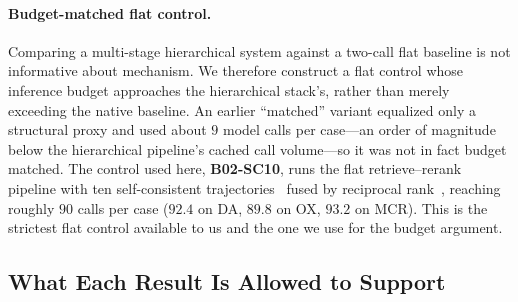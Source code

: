 \paragraph{Budget-matched flat control.}
Comparing a multi-stage hierarchical system against a two-call flat baseline is not informative about mechanism.
We therefore construct a flat control whose inference budget approaches the hierarchical stack's, rather than merely exceeding the native baseline.
An earlier ``matched'' variant equalized only a structural proxy and used about $9$ model calls per case---an order of magnitude below the hierarchical pipeline's cached call volume---so it was not in fact budget matched.
The control used here, \textbf{B02-SC10}, runs the flat retrieve--rerank pipeline with ten self-consistent trajectories~\cite{wang2023selfconsistency} fused by reciprocal rank~\cite{rrf2009}, reaching roughly $90$ calls per case ($92.4$ on DA, $89.8$ on OX, $93.2$ on MCR).
This is the strictest flat control available to us and the one we use for the budget argument.

\subsection{What Each Result Is Allowed to Support}
\label{sec:claim-map}

